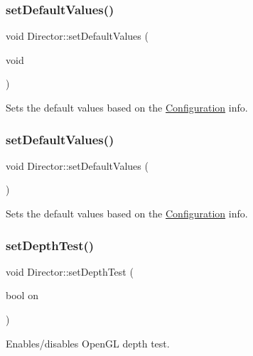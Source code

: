 \subsubsection{\texorpdfstring{set\+Default\+Values()}{setDefaultValues()}\hspace{0.1cm}{\footnotesize\ttfamily [1/2]}}
{\footnotesize\ttfamily void Director\+::set\+Default\+Values (\begin{DoxyParamCaption}\item[{void}]{ }\end{DoxyParamCaption})}

Sets the default values based on the \hyperlink{classConfiguration}{Configuration} info. \mbox{\label{classDirector_a55475c9785f74187a7d337d117224953}} 
\subsubsection{\texorpdfstring{set\+Default\+Values()}{setDefaultValues()}\hspace{0.1cm}{\footnotesize\ttfamily [2/2]}}
{\footnotesize\ttfamily void Director\+::set\+Default\+Values (\begin{DoxyParamCaption}{ }\end{DoxyParamCaption})}

Sets the default values based on the \hyperlink{classConfiguration}{Configuration} info. \mbox{\label{classDirector_a24a276dd9029d03e564c07750872aef6}} 
\subsubsection{\texorpdfstring{set\+Depth\+Test()}{setDepthTest()}\hspace{0.1cm}{\footnotesize\ttfamily [1/2]}}
{\footnotesize\ttfamily void Director\+::set\+Depth\+Test (\begin{DoxyParamCaption}\item[{bool}]{on }\end{DoxyParamCaption})}

Enables/disables Open\+GL depth test. \mbox{\label{classDirector_a24a276dd9029d03e564c07750872aef6}} 
